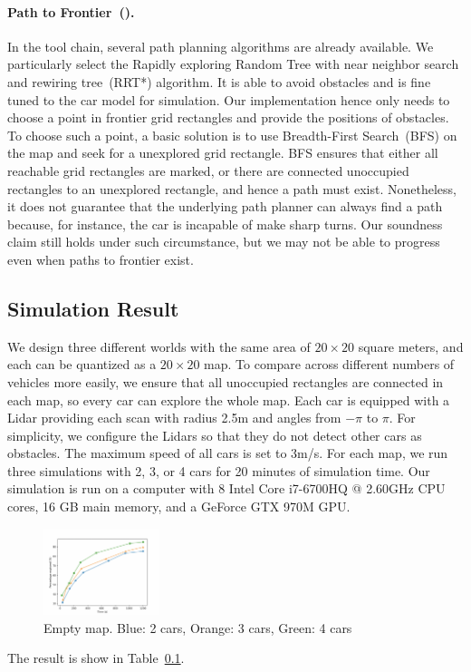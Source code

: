 \paragraph{Path to Frontier~(\PathToFrontier).}
In the \CyPhyHouse tool chain, several path planning algorithms are already available.
We particularly select the Rapidly exploring Random Tree with near neighbor search and rewiring tree~(RRT*) algorithm.
It is able to avoid obstacles and is fine tuned to the car model for simulation.
Our \PathToFrontier implementation hence only needs to choose a point in frontier grid rectangles and provide the positions of obstacles.
To choose such a point, a basic solution is to use Breadth-First Search~(BFS) on the map and seek for a unexplored grid rectangle.
BFS ensures that either all reachable grid rectangles are marked,
or there are connected unoccupied rectangles to an unexplored rectangle, and hence a path must exist.
Nonetheless, it does not guarantee that the underlying path planner can always find a path because,
for instance, the car is incapable of make sharp turns.
Our soundness claim still holds under such circumstance, but we may not be able to progress even when paths to frontier exist.


\subsection{Simulation Result}

We design three different worlds with the same area of $20\times20$ square meters,
and each can be quantized as a $20 \times 20$ map.
To compare across different numbers of vehicles more easily,
we ensure that all unoccupied rectangles are connected in each map,
so every car can explore the whole map.
Each car is equipped with a Lidar providing each scan with radius 2.5m and angles from $-\pi$ to $\pi$.
For simplicity, we configure the Lidars so that they do not detect other cars as obstacles.
The maximum speed of all cars is set to 3m/s.
For each map, we run three simulations with 2, 3, or 4 cars for 20 minutes of simulation time.
Our simulation is run on a computer with 8 Intel Core i7-6700HQ @ 2.60GHz CPU cores, 16 GB main memory, and a GeForce GTX 970M GPU.


\begin{figure}
\includegraphics[width=0.3\textwidth]{figs/fig-empty-map.png}
\caption{Empty map. Blue: 2 cars, Orange: 3 cars, Green: 4 cars}
\end{figure}

The result is show in Table~\ref{}.
